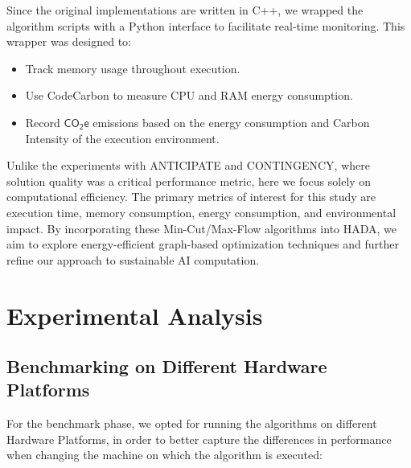 \documentclass[a4paper,singleside,12pt]{report} %
\begin{document}
Since the original implementations are written in C++, we wrapped the algorithm scripts with a Python interface to facilitate 
real-time monitoring. This wrapper was designed to:
\begin{itemize}
    \item Track memory usage throughout execution.
    \item Use CodeCarbon to measure CPU and RAM energy consumption.
    \item Record $\mathsf{CO_2e}$ emissions based on the energy consumption and Carbon Intensity of the execution environment.
\end{itemize}

Unlike the experiments with ANTICIPATE and CONTINGENCY, where solution quality was a critical performance metric, here we focus 
solely on computational efficiency. The primary metrics of interest for this study are execution time, memory consumption, energy 
consumption, and environmental impact. By incorporating these Min-Cut/Max-Flow algorithms into HADA, we aim to explore 
energy-efficient graph-based optimization techniques and further refine our approach to sustainable AI computation.

\chapter{Experimental Analysis}

\section{Benchmarking on Different Hardware Platforms}

For the benchmark phase, we opted for running the algorithms on different Hardware Platforms, in order to better capture the differences in performance
when changing the machine on which the algorithm is executed:
\end{document}
